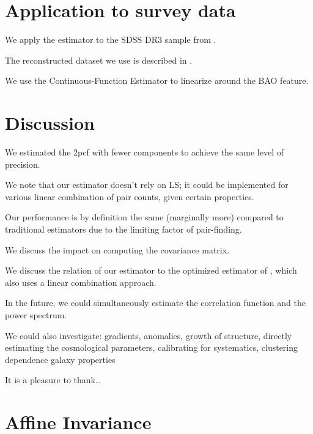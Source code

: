 \documentclass[modern]{aastex62}
\newcommand{\cf}{2pcf\xspace} %
\newcommand{\est}{the Continuous-Function Estimator\xspace}
\newcommand{\LS}{LS\xspace}
\begin{document}
\section{Application to survey data} \label{sec:app}

We apply the estimator to the SDSS DR3 sample from \cite{Eisenstein2005}.

The reconstructed dataset we use is described in \cite{Kazin2010}.

We use \est to linearize around the BAO feature. 

\section{Discussion} \label{sec:discuss}

We estimated the \cf with fewer components to achieve the same level of precision.

We note that our estimator doesn't rely on \LS; it could be implemented for various linear combination of pair counts, given certain properties. %

Our performance is by definition the same (marginally more) compared to traditional estimators due to the limiting factor of pair-finding.

We discuss the impact on computing the covariance matrix.

We discuss the relation of our estimator to the optimized estimator of \cite{VargasMagana2013}, which also uses a linear combination approach.

In the future, we could simultaneously estimate the correlation function and the power spectrum.

We could also investigate: gradients, anomalies, growth of structure, directly estimating the cosmological parameters, calibrating for systematics, clustering dependence galaxy properties


\acknowledgements
It is a pleasure to thank\ldots

\appendix
\section{Affine Invariance}\label{sec:affine}
\end{document}
